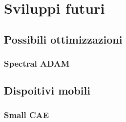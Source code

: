 \chapter{Sviluppi futuri}

\section{Possibili ottimizzazioni}

\subsection{Spectral ADAM}

\section{Dispoitivi mobili}

\subsection{Small CAE}


